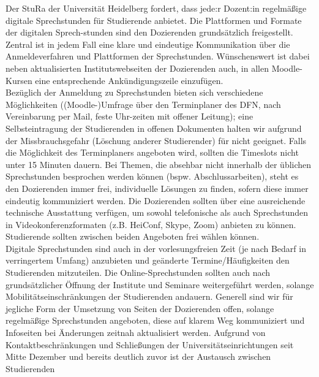     {
        Der StuRa der Universität Heidelberg fordert, dass jede:r Dozent:in regelmäßige
        digitale
        Sprechstunden für Studierende anbietet. Die Plattformen und Formate der digitalen
        Sprech-stunden sind den Dozierenden grundsätzlich freigestellt. Zentral ist in jedem
        Fall
        eine klare und eindeutige Kommunikation über die Anmeldeverfahren und Plattformen
        der Sprechstunden. Wünschenswert ist dabei neben aktualisierten Institutswebseiten
        der
        Dozierenden auch, in allen Moodle-Kursen eine entsprechende Ankündigungszeile
        einzufügen.\\
        Bezüglich der Anmeldung zu Sprechstunden bieten sich verschiedene Möglichkeiten
        ((Moodle-)Umfrage über den Terminplaner des DFN, nach Vereinbarung per Mail, feste
        Uhr-zeiten mit offener Leitung); eine Selbsteintragung der Studierenden in offenen
        Dokumenten halten wir aufgrund der Missbrauchsgefahr (Löschung anderer
        Studierender) für nicht geeignet. Falls die Möglichkeit des Terminplaners angeboten
        wird, sollten die Timeslots nicht unter 15 Minuten dauern. Bei Themen, die absehbar
        nicht innerhalb der üblichen Sprechstunden besprochen werden können (bspw.
        Abschlussarbeiten), steht es den Dozierenden immer frei, individuelle Lösungen zu
        finden, sofern diese immer eindeutig kommuniziert werden.
        Die Dozierenden sollten über eine ausreichende technische Ausstattung verfügen, um
        sowohl telefonische als auch Sprechstunden in Videokonferenzformaten (z.B. HeiConf,
        Skype, Zoom) anbieten zu können. Studierende sollten zwischen beiden Angeboten frei
        wählen können.\\
        Digitale Sprechstunden sind auch in der vorlesungsfreien Zeit (je nach Bedarf in
        verringertem Umfang) anzubieten und geänderte Termine/Häufigkeiten den
        Studierenden mitzuteilen. Die Online-Sprechstunden sollten auch nach grundsätzlicher
        Öffnung der Institute und Seminare weitergeführt werden, solange
        Mobilitätseinschränkungen der Studierenden andauern.
        Generell sind wir für jegliche Form der Umsetzung von Seiten der Dozierenden offen,
        solange regelmäßige Sprechstunden angeboten, diese auf klarem Weg kommuniziert und
        Infoseiten bei Änderungen zeitnah aktualisiert werden.
    }{
        Aufgrund von Kontaktbeschränkungen und Schließungen der Universitätseinrichtungen
        seit Mitte Dezember und bereits deutlich zuvor ist der Austausch zwischen Studierenden
}
